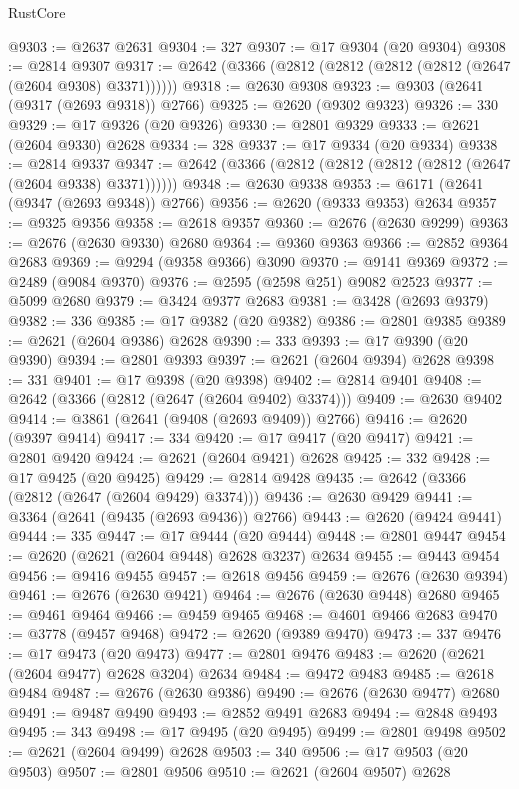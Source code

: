 \begin{lexlean}{RustCore}
\begin{coremodule}
@9303 := @2637 @2631
@9304 := 327
@9307 := @17 @9304 (@20 @9304)
@9308 := @2814 @9307
@9317 := @2642 (@3366 (@2812 (@2812 (@2812 (@2812 (@2647 (@2604 @9308) @3371))))))
@9318 := @2630 @9308
@9323 := @9303 (@2641 (@9317 (@2693 @9318)) @2766)
@9325 := @2620 (@9302 @9323)
@9326 := 330
@9329 := @17 @9326 (@20 @9326)
@9330 := @2801 @9329
@9333 := @2621 (@2604 @9330) @2628
@9334 := 328
@9337 := @17 @9334 (@20 @9334)
@9338 := @2814 @9337
@9347 := @2642 (@3366 (@2812 (@2812 (@2812 (@2812 (@2647 (@2604 @9338) @3371))))))
@9348 := @2630 @9338
@9353 := @6171 (@2641 (@9347 (@2693 @9348)) @2766)
@9356 := @2620 (@9333 @9353) @2634
@9357 := @9325 @9356
@9358 := @2618 @9357
@9360 := @2676 (@2630 @9299)
@9363 := @2676 (@2630 @9330) @2680
@9364 := @9360 @9363
@9366 := @2852 @9364 @2683
@9369 := @9294 (@9358 @9366) @3090
@9370 := @9141 @9369
@9372 := @2489 (@9084 @9370)
@9376 := @2595 (@2598 @251) @9082 @2523
@9377 := @5099 @2680
@9379 := @3424 @9377 @2683
@9381 := @3428 (@2693 @9379)
@9382 := 336
@9385 := @17 @9382 (@20 @9382)
@9386 := @2801 @9385
@9389 := @2621 (@2604 @9386) @2628
@9390 := 333
@9393 := @17 @9390 (@20 @9390)
@9394 := @2801 @9393
@9397 := @2621 (@2604 @9394) @2628
@9398 := 331
@9401 := @17 @9398 (@20 @9398)
@9402 := @2814 @9401
@9408 := @2642 (@3366 (@2812 (@2647 (@2604 @9402) @3374)))
@9409 := @2630 @9402
@9414 := @3861 (@2641 (@9408 (@2693 @9409)) @2766)
@9416 := @2620 (@9397 @9414)
@9417 := 334
@9420 := @17 @9417 (@20 @9417)
@9421 := @2801 @9420
@9424 := @2621 (@2604 @9421) @2628
@9425 := 332
@9428 := @17 @9425 (@20 @9425)
@9429 := @2814 @9428
@9435 := @2642 (@3366 (@2812 (@2647 (@2604 @9429) @3374)))
@9436 := @2630 @9429
@9441 := @3364 (@2641 (@9435 (@2693 @9436)) @2766)
@9443 := @2620 (@9424 @9441)
@9444 := 335
@9447 := @17 @9444 (@20 @9444)
@9448 := @2801 @9447
@9454 := @2620 (@2621 (@2604 @9448) @2628 @3237) @2634
@9455 := @9443 @9454
@9456 := @9416 @9455
@9457 := @2618 @9456
@9459 := @2676 (@2630 @9394)
@9461 := @2676 (@2630 @9421)
@9464 := @2676 (@2630 @9448) @2680
@9465 := @9461 @9464
@9466 := @9459 @9465
@9468 := @4601 @9466 @2683
@9470 := @3778 (@9457 @9468)
@9472 := @2620 (@9389 @9470)
@9473 := 337
@9476 := @17 @9473 (@20 @9473)
@9477 := @2801 @9476
@9483 := @2620 (@2621 (@2604 @9477) @2628 @3204) @2634
@9484 := @9472 @9483
@9485 := @2618 @9484
@9487 := @2676 (@2630 @9386)
@9490 := @2676 (@2630 @9477) @2680
@9491 := @9487 @9490
@9493 := @2852 @9491 @2683
@9494 := @2848 @9493
@9495 := 343
@9498 := @17 @9495 (@20 @9495)
@9499 := @2801 @9498
@9502 := @2621 (@2604 @9499) @2628
@9503 := 340
@9506 := @17 @9503 (@20 @9503)
@9507 := @2801 @9506
@9510 := @2621 (@2604 @9507) @2628

\end{coremodule}
\end{lexlean}
